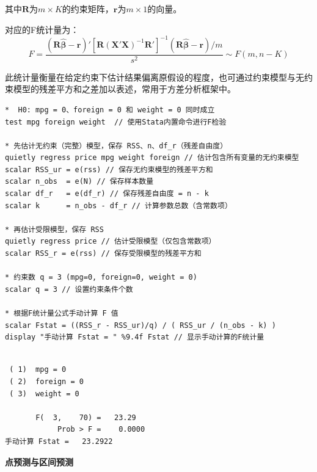 其中$\mathbf{R}$为$m \times K$的约束矩阵，$\mathbf{r}$为$m \times 1$的向量。

对应的F统计量为：
\begin{equation}
	F = \frac{(\mathbf{R}\hat{\boldsymbol{\beta}} - \mathbf{r})'[\mathbf{R}(\mathbf{X}'\mathbf{X})^{-1}\mathbf{R}']^{-1}(\mathbf{R}\hat{\boldsymbol{\beta}} - \mathbf{r}) / m}{s^2} \sim F(m, n - K)
\end{equation}

此统计量衡量在给定约束下估计结果偏离原假设的程度，也可通过约束模型与无约束模型的残差平方和之差加以表述，常用于方差分析框架中。

\begin{tcolorbox}[title=在 Stata 的 Mata 中进行线性约束的 F 检验, colback=white, colframe=black, colbacktitle=white, coltitle=black,fonttitle=\bfseries]
	\begin{lstlisting}[xleftmargin=2em, commentstyle=\color{black}]
*  H0: mpg = 0、foreign = 0 和 weight = 0 同时成立
test mpg foreign weight  // 使用Stata内置命令进行F检验

* 先估计无约束（完整）模型，保存 RSS、n、df_r（残差自由度）
quietly regress price mpg weight foreign // 估计包含所有变量的无约束模型
scalar RSS_ur = e(rss) // 保存无约束模型的残差平方和
scalar n_obs  = e(N) // 保存样本数量
scalar df_r   = e(df_r) // 保存残差自由度 = n - k
scalar k      = n_obs - df_r // 计算参数总数（含常数项）

* 再估计受限模型，保存 RSS
quietly regress price // 估计受限模型（仅包含常数项）
scalar RSS_r = e(rss) // 保存受限模型的残差平方和

* 约束数 q = 3 (mpg=0, foreign=0, weight = 0)
scalar q = 3 // 设置约束条件个数

* 根据F统计量公式手动计算 F 值
scalar Fstat = ((RSS_r - RSS_ur)/q) / ( RSS_ur / (n_obs - k) )
display "手动计算 Fstat = " %9.4f Fstat // 显示手动计算的F统计量
	\end{lstlisting}
	\vspace{-2em}
	\begin{Verbatim}[commandchars=\\\{\},xleftmargin=2em]

 ( 1)  mpg = 0
 ( 2)  foreign = 0
 ( 3)  weight = 0

       F(  3,    70) =   23.29
            Prob > F =    0.0000
手动计算 Fstat =   23.2922
	\end{Verbatim}

\end{tcolorbox}

\textbf{点预测与区间预测}

